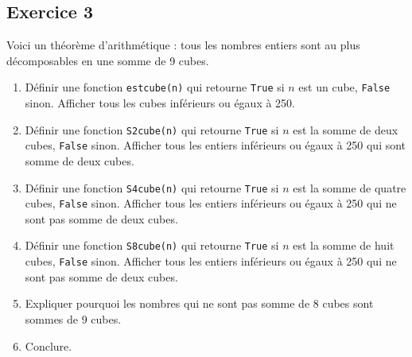 \documentclass[10pt,fleqn]{article} %
\begin{document}
\begin{multicols}{2}
\subsection*{Exercice 3}
Voici un théorème d'arithmétique : tous les nombres entiers sont au plus décomposables en une somme de 9 cubes. 
\begin{enumerate}
\item Définir une fonction \texttt{estcube(n)} qui retourne \texttt{True} si $n$ est un cube, \texttt{False} sinon. Afficher tous les cubes inférieurs ou égaux à 250.
\item Définir une fonction \texttt{S2cube(n)} qui retourne \texttt{True} si $n$ est la somme de deux cubes, \texttt{False} sinon. Afficher tous les entiers inférieurs ou égaux à 250 qui sont somme de deux cubes.
\item Définir une fonction \texttt{S4cube(n)} qui retourne \texttt{True} si $n$ est la somme de quatre cubes, \texttt{False} sinon. Afficher tous les entiers inférieurs ou égaux à 250 qui ne sont pas somme de deux cubes.
\item Définir une fonction \texttt{S8cube(n)} qui retourne \texttt{True} si $n$ est la somme de huit cubes, \texttt{False} sinon. Afficher tous les entiers inférieurs ou égaux à 250 qui ne sont pas somme de deux cubes.
\item Expliquer pourquoi les nombres qui ne sont pas somme de 8 cubes sont sommes de 9 cubes. 
\item Conclure.
\end{enumerate}


\end{multicols}
\end{document}
